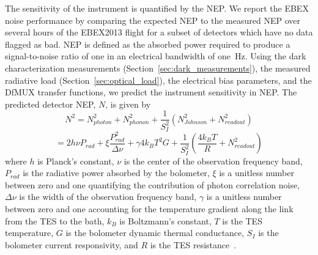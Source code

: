 The sensitivity of the instrument is quantified by the \ac{NEP}. 
We report the \ac{EBEX} noise performance by comparing the expected \ac{NEP} to the measured \ac{NEP} over several hours of the \ac{EBEX2013} flight for a subset of detectors which have no data flagged as bad. 
\ac{NEP} is defined as the absorbed power required to produce a signal-to-noise ratio of one in an electrical bandwidth of one~Hz. 
Using the dark characterization measurements (Section~\ref{sec:dark_measurements}), the measured radiative load (Section~\ref{sec:optical_load}), the electrical bias parameters, and the \ac{DfMUX} transfer functions, we predict the instrument sensitivity in \ac{NEP}. 
The predicted detector \ac{NEP}, $N$, is given by 
\begin{equation}
N^{2} = N_{photon}^2 + N_{phonon}^2 + \frac{1}{S_I^2} ( N_{Johnson}^2 + N_{readout}^2 )
\end{equation}
\begin{equation}
= 2h\nu P_{rad} + \xi \frac{P_{rad}^2}{\Delta \nu} + \gamma 4k_{B} T^2 G + \frac{1}{S_I^2} (\frac{4k_BT}{R} + N_{readout}^2 )
\end{equation}
where $h$ is Planck's constant, $\nu$ is the center of the observation frequency band, $P_{rad}$ is the radiative power absorbed by the bolometer, $\xi$ is a unitless number between zero and one quantifying the contribution of photon correlation noise, $\Delta \nu$ is the width of the observation frequency band, $\gamma$ is a unitless number between zero and one accounting for the temperature gradient along the link from the \ac{TES} to the bath, $k_{B}$ is Boltzmann's constant, $T$ is the \ac{TES} temperature, $G$ is the bolometer dynamic thermal conductance, $S_{I}$ is the bolometer current responsivity, and $R$ is the \ac{TES} resistance~\citep{mather_appliedoptics_1982}. 



